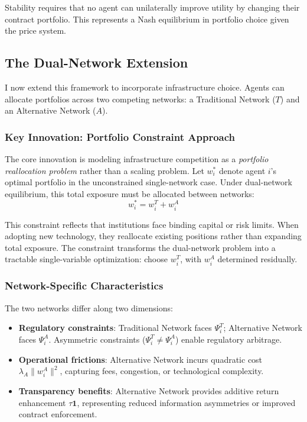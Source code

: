 \documentclass[12pt]{article}
\begin{document}
Stability requires that no agent can unilaterally improve utility by changing their contract portfolio. This represents a Nash equilibrium in portfolio choice given the price system.

\subsection{The Dual-Network Extension}

I now extend this framework to incorporate infrastructure choice. Agents can allocate portfolios across two competing networks: a Traditional Network ($T$) and an Alternative Network ($A$).

\subsubsection{Key Innovation: Portfolio Constraint Approach}

The core innovation is modeling infrastructure competition as a \textit{portfolio reallocation problem} rather than a scaling problem. Let $w_i^*$ denote agent $i$'s optimal portfolio in the unconstrained single-network case. Under dual-network equilibrium, this total exposure must be allocated between networks:
\begin{equation}
\boxed{w_i^* = w_i^T + w_i^A}
\label{eq:portfolio_constraint}
\end{equation}

This constraint reflects that institutions face binding capital or risk limits. When adopting new technology, they reallocate existing positions rather than expanding total exposure. The constraint transforms the dual-network problem into a tractable single-variable optimization: choose $w_i^T$, with $w_i^A$ determined residually.

\subsubsection{Network-Specific Characteristics}

The two networks differ along two dimensions:

\begin{itemize}[noitemsep]
    \item \textbf{Regulatory constraints}: Traditional Network faces $\Psi_i^T$; Alternative Network faces $\Psi_i^A$. Asymmetric constraints ($\Psi_i^T \neq \Psi_i^A$) enable regulatory arbitrage.
    
    \item \textbf{Operational frictions}: Alternative Network incurs quadratic cost $\lambda_A \|w_i^A\|^2$, capturing fees, congestion, or technological complexity.
    
    \item \textbf{Transparency benefits}: Alternative Network provides additive return enhancement $\tau \mathbf{1}$, representing reduced information asymmetries or improved contract enforcement.
\end{itemize}
\end{document}
